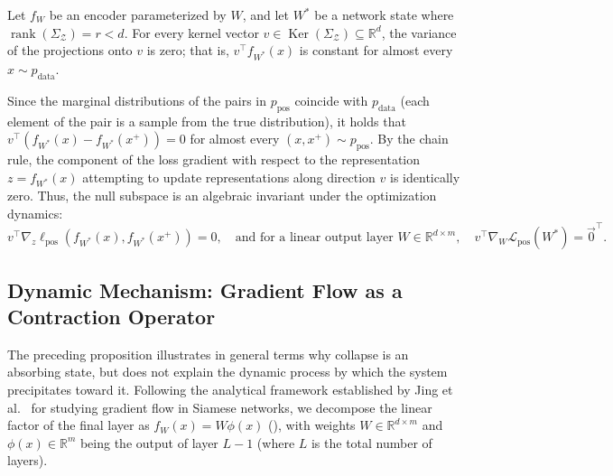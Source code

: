 \documentclass[11pt, oneside, openany]{book}
\DeclareMathOperator{\rank}{rank}
\DeclareMathOperator{\Ker}{Ker}
\begin{document}
\begin{proposition}
\label{prop:3.1}
Let $f_{W}$ be an encoder parameterized by $W$, and let $W^{*}$ be a network state where $\rank(\Sigma_{\mathcal{Z}}) = r < d$. For every kernel vector $v \in \Ker(\Sigma_{\mathcal{Z}}) \subseteq \mathbb{R}^{d}$, the variance of the projections onto $v$ is zero; that is, $v^{\top} f_{W^{*}}(x)$ is constant for almost every $x \sim p_{\text{data}}$.

Since the marginal distributions of the pairs in $p_{\text{pos}}$ coincide with $p_{\text{data}}$ (each element of the pair is a sample from the true distribution), it holds that $v^{\top}(f_{W^{*}}(x) - f_{W^{*}}(x^{+})) = 0$ for almost every $(x, x^{+}) \sim p_{\text{pos}}$. By the chain rule, the component of the loss gradient with respect to the representation $z = f_{W^{*}}(x)$ attempting to update representations along direction $v$ is identically zero. Thus, the null subspace is an algebraic invariant under the optimization dynamics:
\begin{equation}
\label{eq:3.15}
v^{\top} \nabla_{z} \ell_{\text{pos}}(f_{W^{*}}(x), f_{W^{*}}(x^{+})) = 0, \quad \text{and for a linear output layer } W \in \mathbb{R}^{d \times m}, \quad v^{\top} \nabla_{W} \mathcal{L}_{\text{pos}}(W^{*}) = \vec{0}^{\top}.
\end{equation}
\end{proposition}

\subsection*{Dynamic Mechanism: Gradient Flow as a Contraction Operator}

The preceding proposition illustrates in general terms why collapse is an absorbing state, but does not explain the dynamic process by which the system precipitates toward it. Following the analytical framework established by Jing et al.\ \cite{jing2022understanding} for studying gradient flow in Siamese networks, we decompose the linear factor of the final layer as $f_{W}(x) = W \phi(x)$ (), with weights $W \in \mathbb{R}^{d \times m}$ and $\phi(x) \in \mathbb{R}^{m}$ being the output of layer $L-1$ (where $L$ is the total number of layers).
\end{document}
